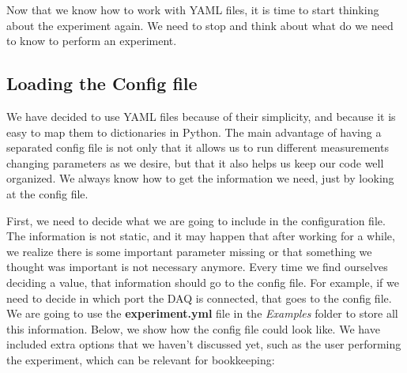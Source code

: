 



Now that we know how to work with YAML files, it is time to start thinking about the experiment again. We need to stop and think about what do we need to know to perform an experiment.


\subsection{Loading the Config file}\label{subsec:loading-the-config}
We have decided to use YAML files because of their simplicity, and because it is easy to map them to dictionaries in Python. The main advantage of having a separated config file is not only that it allows us to run different measurements changing parameters as we desire, but that it also helps us keep our code well organized. We always know how to get the information we need, just by looking at the config file.

First, we need to decide what we are going to include in the configuration file. The information is not static, and it may happen that after working for a while, we realize there is some important parameter missing or that something we thought was important is not necessary anymore. Every time we find ourselves deciding a value, that information should go to the config file. For example, if we need to decide in which port the DAQ is connected, that goes to the config file. We are going to use the \textbf{experiment.yml} file in the \emph{Examples} folder to store all this information. Below, we show how the config file could look like. We have included extra options that we haven't discussed yet, such as the user performing the experiment, which can be relevant for bookkeeping:

